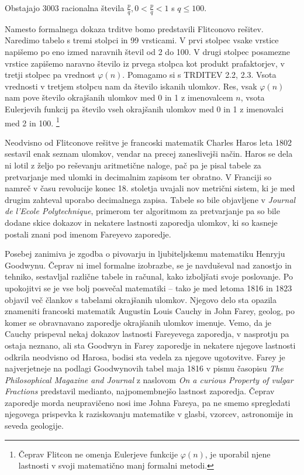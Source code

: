 \documentclass[mat1]{fmfdelo}
\begin{document}
\begin{trditev}
Obstajajo 3003 racionalna števila $\frac{p}{q}, 0 < \frac{p}{q} < 1$ s $q \leq 100$.
\end{trditev}

Namesto formalnega dokaza trditve bomo predstavili Flitconovo rešitev. Naredimo tabelo s tremi stolpci in 99 vrsticami. V prvi stolpec vsake vrstice napišemo po eno izmed naravnih števil od 2 do 100. V drugi stolpec posamezne vrstice zapišemo naravno število iz prvega stolpca kot produkt prafaktorjev, v tretji stolpec pa vrednost $\varphi(n)$. Pomagamo si s TRDITEV 2.2, 2.3. Vsota vrednosti v tretjem stolpcu nam da število iskanih ulomkov. Res, vsak $\varphi(n)$ nam pove število okrajšanih ulomkov med 0 in 1 z imenovalcem $n$, vsota Eulerjevih funkcij pa število vseh okrajšanih ulomkov med 0 in 1 z imenovalci med 2 in 100. \footnote{Čeprav Flitcon ne omenja Eulerjeve funkcije $\varphi(n)$, je uporabil njene lastnosti v svoji matematično manj formalni metodi.}

Neodvisno od Flitconove rešitve je francoski matematik Charles Haros leta 1802 sestavil enak seznam ulomkov, vendar na precej zaneslivejši način. Haros se dela ni lotil z željo po reševanju aritmetične naloge, pač pa je pisal tabele za pretvarjanje med ulomki in decimalnim zapisom ter obratno. V Franciji so namreč v času revolucije konec 18. stoletja uvajali nov metrični sistem, ki je med drugim zahteval uporabo decimalnega zapisa. Tabele so bile objavljene v \emph{Journal de l'Ecole Polytechnique}, primerom ter algoritmom za pretvarjanje pa so bile dodane skice dokazov in nekatere lastnosti zaporedja ulomkov, ki so kasneje postali znani pod imenom Fareyevo zaporedje. 

Posebej zanimiva je zgodba o pivovarju in ljubiteljskemu matematiku Henryju Goodwynu. Čeprav ni imel formalne izobrazbe, se je navduševal nad zanostjo in tehniko, sestavljal različne tabele in računal, kako izboljšati svoje poslovanje. Po upokojitvi se je vse bolj posvečal matematiki -- tako je med letoma 1816 in 1823 objavil več člankov s tabelami okrajšanih ulomkov. Njegovo delo sta opazila znameniti francoski matematik Augustin Louis Cauchy in John Farey, geolog, po komer se obravnavano zaporedje okrajšanih ulomkov imenuje. Vemo, da je Cauchy prispeval nekaj dokazov lastnosti Fareyevega zaporedja, v nasprotju pa ostaja neznano, ali sta Goodwyn in Farey zaporedje in nekatere njegove lastnosti odkrila neodvisno od Harosa, bodisi sta vedela za njegove ugotovitve. Farey je najverjetneje na podlagi Goodwynovih tabel maja 1816 v pismu časopisu \emph{The Philosophical Magazine and Journal} z naslovom \emph{On a curious Property of vulgar Fractions} predstavil medianto, najpomembnejšo lastnost zaporedja. Čeprav zaporedje morda neupravičeno nosi ime Johna Fareya, pa ne smemo spregledati njegovega prispevka k raziskovanju matematike v glasbi, vzorcev, astronomije in seveda geologije.
\end{document}
